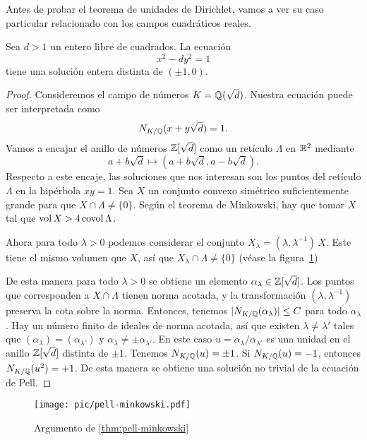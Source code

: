 Antes de probar el teorema de unidades de Dirichlet, vamos a ver su caso
particular relacionado con los campos cuadráticos reales.

\begin{teorema}
  \label{thm:pell-minkowski}
  Sea $d > 1$ un entero libre de cuadrados. La ecuación
  $$x^2 - dy^2 = 1$$
  tiene una solución entera distinta de $(\pm 1, 0)$.

  \begin{proof}
    Consideremos el campo de números $K = \mathbb{Q} (\sqrt{d})$. Nuestra ecuación
    puede ser interpretada como
    $$N_{K/\mathbb{Q}} (x + y\sqrt{d}) = 1.$$
    Vamos a encajar el anillo de números $\mathbb{Z} [\sqrt{d}]$ como un retículo
    $\Lambda$ en $\mathbb{R}^2$ mediante
    $$a + b\sqrt{d} \mapsto (a + b\sqrt{d}, a - b\sqrt{d}).$$
    Respecto a este encaje, las soluciones que nos interesan son los puntos
    del retículo $\Lambda$ en la hipérbola $xy = 1$. Sea $X$ un conjunto
    convexo simétrico suficientemente grande para que
    $X \cap \Lambda \ne \{ 0 \}$. Según el teorema de Minkowski, hay que
    tomar $X$ tal que $\operatorname{vol} X > 4 \operatorname{covol} \Lambda$.

    Ahora para todo $\lambda > 0$ podemos considerar el conjunto
    $X_\lambda = (\lambda, \lambda^{-1})\,X$. Este tiene el mismo volumen que
    $X$, así que $X_\lambda \cap \Lambda \ne \{ 0 \}$
    (véase la figura~\ref{fig:pell-minkowski})

    De esta manera para todo $\lambda > 0$ se obtiene un elemento
    $\alpha_\lambda \in \mathbb{Z} [\sqrt{d}]$. Los puntos que corresponden a
    $X \cap \Lambda$ tienen norma acotada, y la transformación
    $(\lambda, \lambda^{-1})$ preserva la cota sobre la norma. Entonces,
    tenemos $|N_{K/\mathbb{Q}} (\alpha_\lambda)| \le C$ para todo $\alpha_\lambda$.
    Hay un número finito de ideales de norma acotada, así que existen
    $\lambda \ne \lambda'$ tales que $(\alpha_\lambda) = (\alpha_{\lambda'})$
    y $\alpha_\lambda \ne \pm\alpha_{\lambda'}$. En este caso
    $u = \alpha_\lambda/\alpha_{\lambda'}$ es una unidad en el anillo
    $\mathbb{Z} [\sqrt{d}]$ distinta de $\pm 1$. Tenemos $N_{K/\mathbb{Q}} (u) = \pm 1$.
    Si $N_{K/\mathbb{Q}} (u) = -1$, entonces $N_{K/\mathbb{Q}} (u^2) = +1$. De esta manera
    se obtiene una solución no trivial de la ecuación de Pell.
  \end{proof}
\end{teorema}

\begin{figure}
  \begin{center}
    \texttt{[image: pic/pell-minkowski.pdf]}
  \end{center}

  \caption{Argumento de \ref{thm:pell-minkowski}}
  \label{fig:pell-minkowski}
\end{figure}

